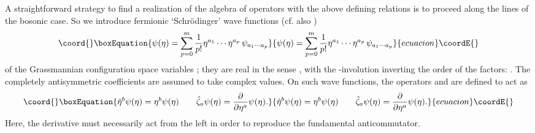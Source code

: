 \documentclass[a4paper,10pt]{article}
\begin{document}
A straightforward strategy to find a realization of the algebra of operators with the 
above defining relations is to proceed along the lines of the bosonic case. So we 
introduce fermionic `Schr\" odinger' wave functions (cf. also \cite{Thom 88,Holt 90})
\begin{equation}\coord{}\boxEquation{
\psi(\eta)=\sum_{p=0}^{m}\frac{1}{p!}\eta^{a_1}\cdots\eta^{a_p}\,\psi_{a_1\cdots a_p}
}{
\psi(\eta)=\sum_{p=0}^{m}\frac{1}{p!}\eta^{a_1}\cdots\eta^{a_p}\,\psi_{a_1\cdots a_p}
}{ecuacion}\coordE{}\end{equation}
of the Grassmannian configuration space variables \coordHE{}; they are real in the sense 
\coordHE{}, with the \myHighlight{$\ast$}\coordHE{}-involution inverting the order of the factors: 
\coordHE{}. The completely 
antisymmetric coefficients \coordHE{} are assumed to take complex values. On 
such wave functions, the operators \coordHE{} and \coordHE{} are defined to act 
as
\begin{equation}\coord{}\boxEquation{\label{hatetajpsietaequaletajpsieta}
\hat{\eta}^b\psi(\eta)=\eta^b\psi(\eta)\qquad\hat{\zeta}_a\psi(\eta)=\frac{\partial}
{\partial\eta^a}\psi(\eta).
}{\hat{\eta}^b\psi(\eta)=\eta^b\psi(\eta)\qquad\hat{\zeta}_a\psi(\eta)=\frac{\partial}
{\partial\eta^a}\psi(\eta).
}{ecuacion}\coordE{}\end{equation}
Here, the derivative must necessarily act from the left in order to reproduce the 
fundamental anticommutator. 
\end{document}
